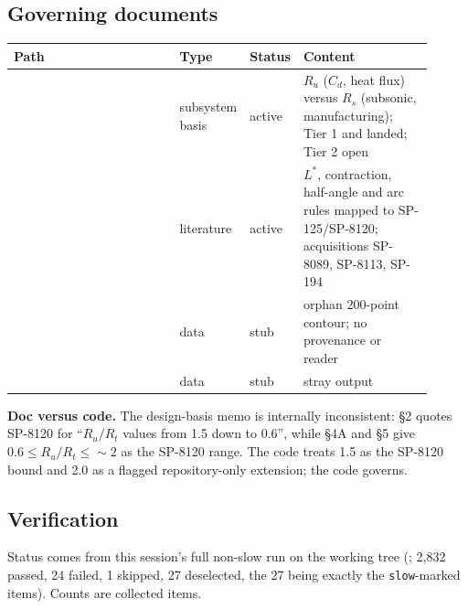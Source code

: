 \subsection{Governing documents}

\begingroup\small
\begin{longtable}{@{}P{0.40\linewidth}P{0.12\linewidth}P{0.08\linewidth}P{0.31\linewidth}@{}}
\toprule
\textbf{Path} & \textbf{Type} & \textbf{Status} & \textbf{Content} \\ \midrule
\endhead
{} & subsystem basis & active & $R_u$ ($C_d$, heat flux) versus $R_s$ (subsonic, manufacturing); Tier 1 and  landed; Tier 2 open \\
 & literature & active & $L^*$, contraction, half-angle and arc rules mapped to SP-125/SP-8120; acquisitions SP-8089, SP-8113, SP-194 \\
 & data & stub & orphan 200-point contour; no provenance or reader \\
 & data & stub & stray  output \\
\bottomrule
\end{longtable}
\endgroup

\textbf{Doc versus code.} The design-basis memo is internally inconsistent: \S2 quotes SP-8120 for ``$R_u/R_t$
values from 1.5 down to 0.6'', while \S4A and \S5 give $0.6 \le R_u/R_t \le {\sim}2$ as the SP-8120 range. The code
treats 1.5 as the SP-8120 bound and 2.0 as a flagged repository-only extension; the code governs.

\subsection{Verification}\label{sec:s05-verification}

Status comes from this session's full non-slow run on the working tree (; 2,832 passed, 24
failed, 1 skipped, 27 deselected, the 27 being exactly the \texttt{slow}-marked items). Counts are collected items.

